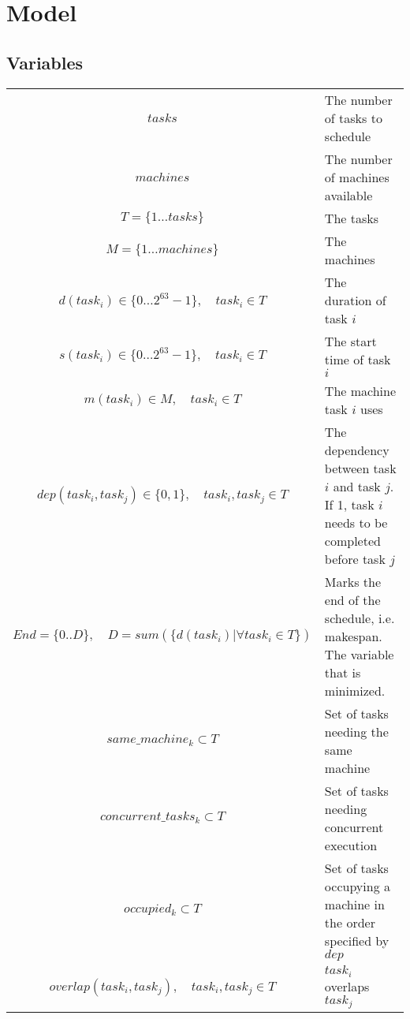 \documentclass[10pt,a4paper]{report}
\begin{document}
\section*{Model}
\subsection*{Variables}
\renewcommand{\arraystretch}{2}
\begin{tabular}{c p{5cm}}
$tasks$ & The number of tasks to schedule \\

$machines$ & The number of machines available \\

$T = \{1 \ldots tasks\}$ & The tasks \\

$M = \{1 \ldots machines\}$ & The machines \\

$d(task_{i}) \in \{0 \ldots 2^{63}-1\}, \quad task_{i} \in T$ & The duration of task $i$ \\

$s(task_{i}) \in \{0 \ldots 2^{63}-1\}, \quad task_{i} \in T$ & The start time of task $i$ \\

$m(task_{i}) \in M, \quad task_{i} \in T$ & The machine task $i$ uses \\

$dep(task_{i},task_{j}) \in \{0,1\}, \quad task_{i}, task_{j} \in T$ &  The dependency between task $i$ and task $j$. If 1, task $i$ needs to be completed before task $j$ \\

$End = \{0..D\},\quad D = sum(\{d(task_{i})|\forall task_{i} \in T\})$ & Marks the end of the schedule, i.e. makespan. The variable that is minimized.\\

$same\_machine_{k} \subset T$ & Set of tasks needing the same machine\\

$concurrent\_tasks_{k} \subset T$ & Set of tasks needing concurrent execution \\

$occupied_{k} \subset T$ & Set of tasks occupying a machine in the order specified by $dep$\\

$overlap(task_{i}, task_{j}), \quad task_{i},task_{j} \in T$ & $task_{i}$ overlaps $task_{j}$\\

\end{tabular}
\end{document}
